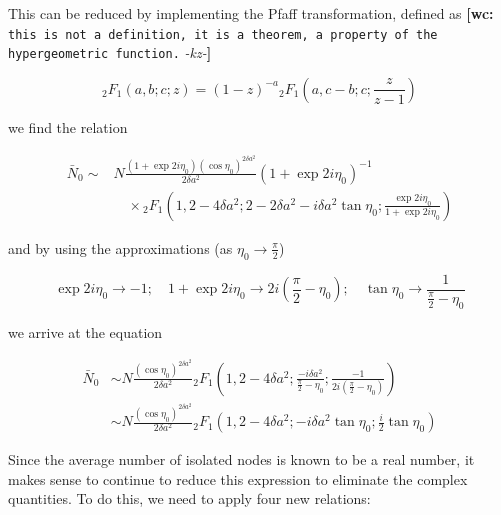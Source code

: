 \documentclass[preprint,notitlepage,amsmath,amssymb,floatfix]{revtex4-1}
\newcommand{\XXX}[3]{{\bf [#1: } {\tt #3} {\it -#2-}{\bf ]}}
\begin{document}
\noindent This can be reduced by implementing the Pfaff transformation, defined as \XXX{wc}{kz}{this is not a definition, it is a theorem, a property of the hypergeometric function.}

\begin{equation}
{}_2F_1\left(a,b;c;z\right) = \left(1-z\right)^{-a} {}_2F_1\left(a,c-b;c;\frac{z}{z-1}\right)
\end{equation}

\noindent we find the relation

\begin{equation}
\begin{split}
\bar{N}_0 \sim &N\frac{\left(1+\exp{2i\eta_0}\right)\left(\cos\eta_0\right)^{2\delta a^2}}{2\delta a^2}\left(1+\exp{2i\eta_0}\right)^{-1} \\
&\quad \times {}_2F_1\left(1,2-4\delta a^2;2-2\delta a^2-i\delta a^2\tan\eta_0;\frac{\exp{2i\eta_0}}{1+\exp{2i\eta_0}}\right)
\end{split}
\end{equation}

\noindent and by using the approximations (as $\eta_0\to\frac{\pi}{2}$)

\begin{equation}
\exp{2i\eta_0}\to -1;\quad 1+\exp{2i\eta_0}\to 2i\left(\frac{\pi}{2} - \eta_0\right);\quad \tan\eta_0\to\frac{1}{\frac{\pi}{2}-\eta_0}
\end{equation}

we arrive at the equation

\begin{equation}
\begin{split}
\bar{N}_0 &\sim N\frac{\left(\cos\eta_0\right)^{2\delta a^2}}{2\delta a^2} {}_2F_1\left(1,2-4\delta a^2;\frac{-i\delta a^2}{\frac{\pi}{2}-\eta_0};\frac{-1}{2i\left(\frac{\pi}{2}-\eta_0\right)}\right) \\
&\sim N\frac{\left(\cos\eta_0\right)^{2\delta a^2}}{2\delta a^2} {}_2F_1\left(1,2-4\delta a^2;-i\delta a^2\tan\eta_0;\frac{i}{2}\tan\eta_0\right)
\end{split}
\end{equation}

Since the average number of isolated nodes is known to be a real number, it makes sense to continue to reduce this expression to eliminate the complex quantities.  
To do this, we need to apply four new relations:
\end{document}
